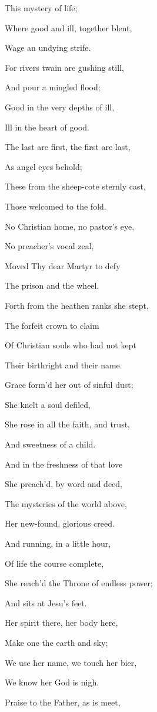 This mystery of life;

Where good and ill, together blent,

Wage an undying strife.

For rivers twain are gushing still,

And pour a mingled flood;

Good in the very depths of ill,

Ill in the heart of good.

The last are first, the first are last,

As angel eyes behold;

These from the sheep-cote sternly cast,

Those welcomed to the fold. 

No Christian home, no pastor's eye,

No preacher's vocal zeal,

Moved Thy dear Martyr to defy

The prison and the wheel.

Forth from the heathen ranks she stept,

The forfeit crown to claim

Of Christian souls who had not kept

Their birthright and their name.

Grace form'd her out of sinful dust;

She knelt a soul defiled,

She rose in all the faith, and trust,

And sweetness of a child.

And in the freshness of that love

She preach'd, by word and deed,

The mysteries of the world above,

Her new-found, glorious creed.

And running, in a little hour,

Of life the course complete,

She reach'd the Throne of endless power;

And sits at Jesu's feet. 

Her spirit there, her body here,

Make one the earth and sky;

We use her name, we touch her bier,

We know her God is nigh.

Praise to the Father, as is meet,

